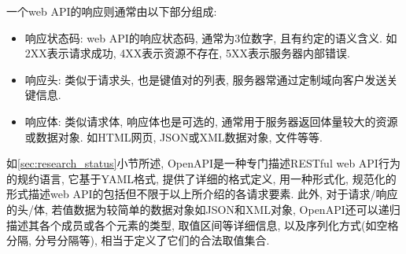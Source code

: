         一个web API的响应则通常由以下部分组成:
        \begin{itemize}
            \item 响应状态码: web API的响应状态码, 通常为3位数字, 且有约定的语义含义. 如2XX表示请求成功, 4XX表示资源不存在, 5XX表示服务器内部错误.
            
            \item 响应头: 类似于请求头, 也是键值对的列表, 服务器常通过定制域向客户发送关键信息.
            
            \item 响应体: 类似请求体, 响应体也是可选的, 通常用于服务器返回体量较大的资源或数据对象. 如HTML网页, JSON或XML数据对象, 文件等等.
        \end{itemize}
        
        如\ref{sec:research_status}小节所述, OpenAPI\cite{openapi17}是一种专门描述RESTful web API行为的规约语言, 它基于YAML格式, 提供了详细的格式定义, 用一种形式化, 规范化的形式描述web API的包括但不限于以上所介绍的各请求要素. 此外, 对于请求/响应的头/体, 若值数据为较简单的数据对象如JSON和XML对象, OpenAPI还可以递归描述其各个成员或各个元素的类型, 取值区间等详细信息, 以及序列化方式(如空格分隔, 分号分隔等), 相当于定义了它们的合法取值集合.
        

